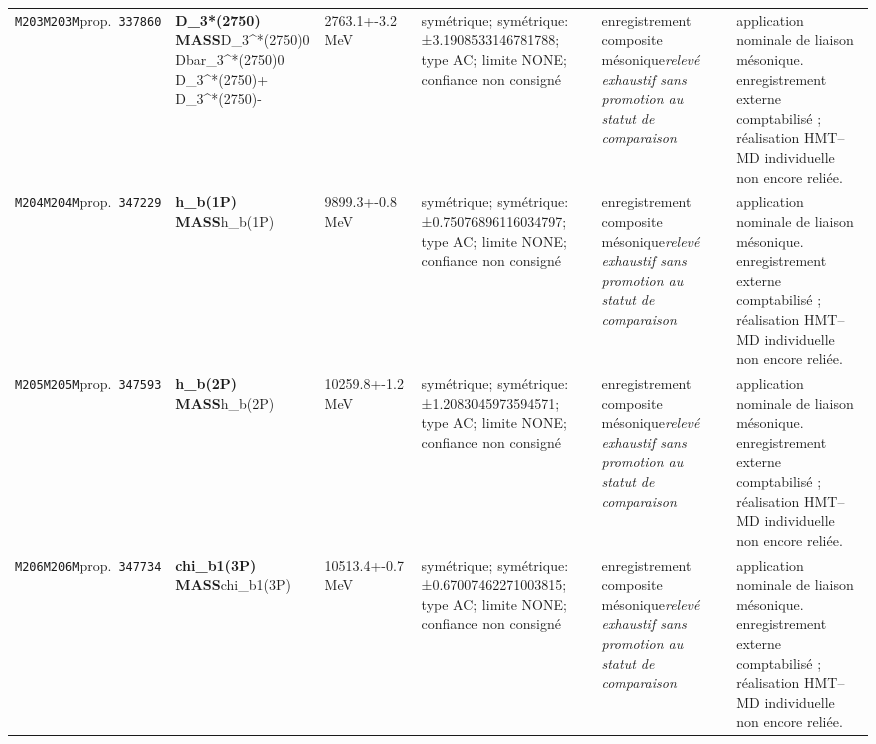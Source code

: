\begin{landscape}
\begin{longtable}{L{1.85cm}L{4.45cm}L{2.35cm}L{4.05cm}L{3.35cm}L{7.15cm}}
\texttt{M203}\newline \texttt{M203M}\newline prop.\ \texttt{337860} & \textbf{D\_\allowbreak{}3*(2750) MASS}\newline D\_\allowbreak{}3\textasciicircum{}*(2750)0 \textbar{}\allowbreak{} Dbar\_\allowbreak{}3\textasciicircum{}*(2750)0 \textbar{}\allowbreak{} D\_\allowbreak{}3\textasciicircum{}*(2750)+ \textbar{}\allowbreak{} D\_\allowbreak{}3\textasciicircum{}*(2750)- & 2763.1+-3.2\,MeV & symétrique; symétrique: ±3.1908533146781788; type AC; limite NONE; confiance non consigné & enregistrement composite mésonique\newline \emph{relevé exhaustif sans promotion au statut de comparaison} & application nominale de liaison mésonique. enregistrement externe comptabilisé ; réalisation HMT--MD individuelle non encore reliée. \\
\texttt{M204}\newline \texttt{M204M}\newline prop.\ \texttt{347229} & \textbf{h\_\allowbreak{}b(1P) MASS}\newline h\_\allowbreak{}b(1P) & 9899.3+-0.8\,MeV & symétrique; symétrique: ±0.75076896116034797; type AC; limite NONE; confiance non consigné & enregistrement composite mésonique\newline \emph{relevé exhaustif sans promotion au statut de comparaison} & application nominale de liaison mésonique. enregistrement externe comptabilisé ; réalisation HMT--MD individuelle non encore reliée. \\
\texttt{M205}\newline \texttt{M205M}\newline prop.\ \texttt{347593} & \textbf{h\_\allowbreak{}b(2P) MASS}\newline h\_\allowbreak{}b(2P) & 10259.8+-1.2\,MeV & symétrique; symétrique: ±1.2083045973594571; type AC; limite NONE; confiance non consigné & enregistrement composite mésonique\newline \emph{relevé exhaustif sans promotion au statut de comparaison} & application nominale de liaison mésonique. enregistrement externe comptabilisé ; réalisation HMT--MD individuelle non encore reliée. \\
\texttt{M206}\newline \texttt{M206M}\newline prop.\ \texttt{347734} & \textbf{chi\_\allowbreak{}b1(3P) MASS}\newline chi\_\allowbreak{}b1(3P) & 10513.4+-0.7\,MeV & symétrique; symétrique: ±0.67007462271003815; type AC; limite NONE; confiance non consigné & enregistrement composite mésonique\newline \emph{relevé exhaustif sans promotion au statut de comparaison} & application nominale de liaison mésonique. enregistrement externe comptabilisé ; réalisation HMT--MD individuelle non encore reliée. \\

\end{longtable}
\end{landscape}
